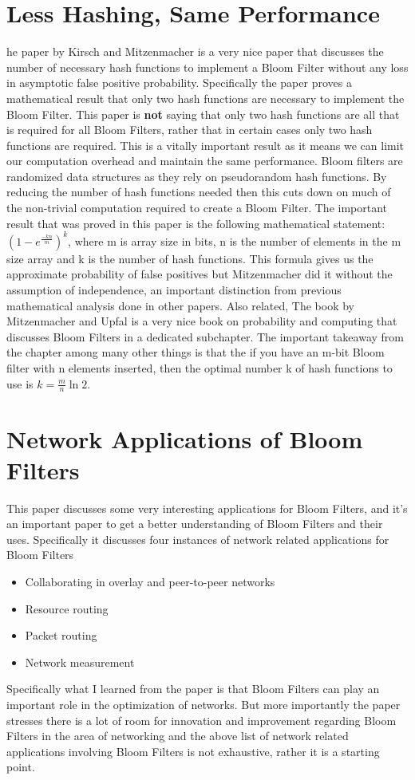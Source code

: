 \documentclass[MScCS]{uccthesis}
\begin{document}
\section{Less Hashing, Same Performance}
he paper by  Kirsch and Mitzenmacher \cite{kirsch2006less} is a very nice paper that discusses the number of necessary hash functions to implement a Bloom Filter without any loss in asymptotic false positive probability. Specifically the paper proves a mathematical result that only two hash functions are necessary to implement the Bloom Filter. This paper is \textbf{not} saying that only two hash functions are all that is required for all Bloom Filters, rather that in certain cases only two hash functions are required. This is a vitally important result as it means we can limit our computation overhead and maintain the same performance. Bloom filters are randomized data structures as they rely on pseudorandom hash functions. By reducing the number of hash functions needed then this cuts down on much of the non-trivial computation required to create a Bloom Filter. The important result that was proved in this paper is the following mathematical statement: $(1-e^\frac{-kn}{m})^k$, where m is array size in bits, n is the number of elements in the m size array and k is the number of hash functions. This formula gives us the approximate probability of false positives but Mitzenmacher did it without the assumption of independence, an important distinction from previous mathematical analysis done in other papers. Also related, The book by Mitzenmacher and Upfal \cite{mitzenmacher2017probability} is a very nice book on probability and computing that discusses Bloom Filters in a dedicated subchapter. The important takeaway from the chapter among many other things is that the if you have an m-bit Bloom filter with n elements inserted, then the optimal number k of hash functions to use is $k = \frac{m}{n}\ln 2$.

\section{Network Applications of Bloom Filters}
This paper\cite{broder2004network} discusses some very interesting applications for Bloom Filters, and it's an important paper to get a better understanding of Bloom Filters and their uses. Specifically it discusses four instances of network related applications for Bloom Filters
\begin{itemize}
    \item Collaborating in overlay and peer-to-peer networks
    \item Resource routing
    \item Packet routing
    \item Network measurement
\end{itemize}
Specifically what I learned from the paper is that Bloom Filters can play an important role in the optimization of networks. But more importantly the paper stresses there is a lot of room for innovation and improvement regarding Bloom Filters in the area of networking and the above list of network related applications involving Bloom Filters is not exhaustive, rather it is a starting point.
\end{document}

